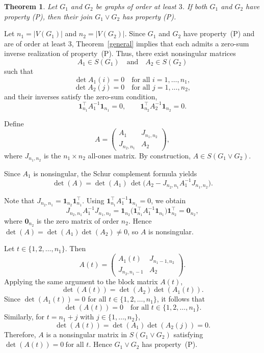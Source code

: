 \documentclass[12pt,reqno]{amsart}
\newtheorem{thm}{Theorem}[section]
\theoremstyle{definition}
\numberwithin{equation}{subsection}
\newenvironment{pf}{\proof}{\endproof}
\numberwithin{equation}{section}
\def\det{\operatorname{det}}
\begin{document}
\begin{thm}\label{join}
 Let $G_1$ and $G_2$ be graphs of order at least $3$. If both $G_1$ and $G_2$ have property (P), then their join $G_1 \vee G_2$ has property (P).
\end{thm}
\begin{pf}
Let $n_1=|V(G_1)|$ and $n_2=|V(G_2)|$. Since $G_1$ and $G_2$ have property~(P) and are of order at least $3$, Theorem~\ref{general} implies that each admits a zero-sum inverse realization of property~(P).
Thus, there exist nonsingular matrices
\[
A_1\in S(G_1) \quad \text{and} \quad A_2\in S(G_2)
\]
such that
\[
\det A_1(i)=0 \quad \text{for all } i=1,\dots,n_1,
\]
\[
\det A_2(j)=0 \quad \text{for all } j=1,\dots,n_2,
\]
and their inverses satisfy the zero-sum condition,
\[
\mathbf{1}_{n_1}^\top A_1^{-1}\mathbf{1}_{n_1}=0, \qquad \mathbf{1}_{n_2}^\top A_2^{-1}\mathbf{1}_{n_2}=0.
\]

Define
\[
A = 
\begin{pmatrix}
A_1 & J_{n_1,n_2} \\[2mm]
J_{n_2,n_1} & A_2
\end{pmatrix},
\]
where $J_{n_1,n_2}$ is the $n_1 \times n_2$ all-ones matrix. By construction, $A \in S(G_1 \vee G_2)$.


Since $A_1$ is nonsingular, the Schur complement formula yields
\[
\det(A) = \det(A_1)\,\det\Big(A_2 - J_{n_2,n_1} A_1^{-1} J_{n_1,n_2}\Big).
\]

Note that $J_{n_2,n_1} = \mathbf{1}_{n_2}\mathbf{1}_{n_1}^{\top}$. Using  
$\mathbf{1}_{n_1}^{\top} A_1^{-1} \mathbf{1}_{n_1} = 0$, we obtain
\[
J_{n_2,n_1} A_1^{-1} J_{n_1,n_2}
= \mathbf{1}_{n_2} \Big(\mathbf{1}_{n_1}^{\top} A_1^{-1} \mathbf{1}_{n_1}\Big) \mathbf{1}_{n_2}^{\top}
= \mathbf{0}_{n_2},
\]
 where $\mathbf{0}_{n_2}$ is the zero matrix of order $n_2$.
Hence \(\det(A)=\det(A_1)\det(A_2)\neq 0\), so \(A\) is nonsingular.

Let $t \in \{1,2,\dots,n_1\}$. Then
\[
A(t)= 
\begin{pmatrix}
A_1(t) & J_{n_1-1,n_2}\\[2mm]
J_{n_2,n_1-1} & A_2
\end{pmatrix}.
\]
Applying the same argument to the block matrix $A(t)$,
\[
\det(A(t))=\det(A_2)\det(A_1(t)).
\]
Since $\det(A_1(t))=0$ for all $t \in \{1,2,\dots,n_1\}$, it follows that
\[
\det(A(t))=0 \quad \text{for all } t \in \{1,2,\dots,n_1\}.
\]
Similarly, for $t=n_1+j$ with $j\in\{1,\dots,n_2\}$,
\[
\det(A(t))=\det(A_1)\det(A_2(j))=0.
\]
Therefore, $A$ is a nonsingular matrix in $S(G_1\vee G_2)$ satisfying
\(
\det(A(t))=0
\ \text{for all }t.
\)
Hence $G_1\vee G_2$ has property~(P).
\end{pf}
\end{document}
